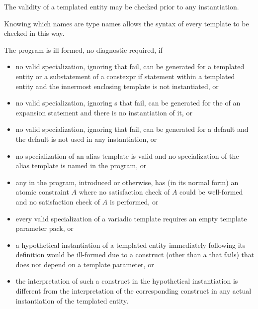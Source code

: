 \pnum
{}%
%
The validity of a templated entity may be checked prior to any instantiation.
\begin{note}
Knowing which names are type names allows the syntax of every template
to be checked in this way.
\end{note}
The program is ill-formed, no diagnostic required, if
\begin{itemize}
\item
no valid specialization,
ignoring  that fail,
can be generated for a templated entity
or a substatement of a constexpr if statement
within a templated entity
and the innermost enclosing template is not instantiated, or
\item
no valid specialization,
ignoring s that fail,
can be generated for the 
of an expansion statement and there is no instantiation of it, or
\item
no valid specialization,
ignoring  that fail,
can be generated for a default  and
the default  is not used in any instantiation, or
\item
no specialization of an alias template is valid and
no specialization of the alias template is named in the program, or
\item
any  in the program, introduced or otherwise,
has (in its normal form) an atomic constraint $A$ where
no satisfaction check of $A$ could be well-formed and
no satisfaction check of $A$ is performed, or
\item
every valid specialization of a variadic template requires an empty template
parameter pack, or
\item
a hypothetical instantiation of a templated entity
immediately following its definition
would be ill-formed
due to a construct
(other than a  that fails)
that does not depend on a template parameter, or
\item
the interpretation of such a construct
in the hypothetical instantiation
is different from
the interpretation of the corresponding construct
in any actual instantiation of the templated entity.
\end{itemize}
